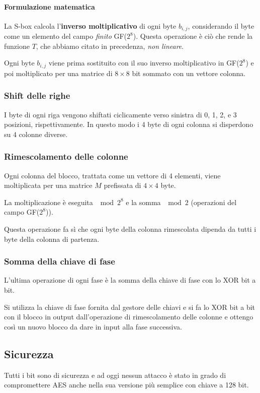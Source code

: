 \paragraph{Formulazione matematica}
La S-box calcola l'\textbf{inverso moltiplicativo} di ogni byte $b_{i, j}$, considerando il byte come un elemento del
campo \emph{finito} GF($2^8$). Questa operazione \`e ci\`o che rende la funzione $T$, che abbiamo citato in precedenza,
\emph{non lineare}.

Ogni byte $b_{i, j}$ viene prima sostituito con il suo inverso moltiplicativo in GF($2^8$) e poi moltiplicato per una
matrice di $8 \times 8$ bit sommato con un vettore colonna.

\subsubsection{Shift delle righe}
I byte di ogni riga vengono shiftati ciclicamente verso sinistra di 0, 1, 2, e 3 posizioni, rispettivamente. In questo
modo i 4 byte di ogni colonna si disperdono su 4 colonne diverse.

\subsubsection{Rimescolamento delle colonne}
Ogni colonna del blocco, trattata come un vettore di 4 elementi, viene moltiplicata per una matrice $M$ prefissata di
$4 \times 4$ byte.

La moltiplicazione \`e eseguita $\mod{2^8}$ e la somma $\mod{2}$ (operazioni del campo GF($2^8$)).

Questa operazione fa s\`i che ogni byte della colonna rimescolata dipenda da tutti i byte della colonna di partenza.

\subsubsection{Somma della chiave di fase}
L'ultima operazione di ogni fase \`e la somma della chiave di fase con lo XOR bit a bit.

Si utilizza la chiave di fase fornita dal gestore delle chiavi e si fa lo XOR bit a bit con il blocco in output
dall'operazione di rimescolamento delle colonne e ottengo cos\`i un nuovo blocco da dare in input alla fase successiva.

\subsection{Sicurezza}
Tutti i bit sono di sicurezza e ad oggi nessun attacco \`e stato in grado di compromettere AES anche nella sua versione
pi\`u semplice con chiave a 128 bit.

